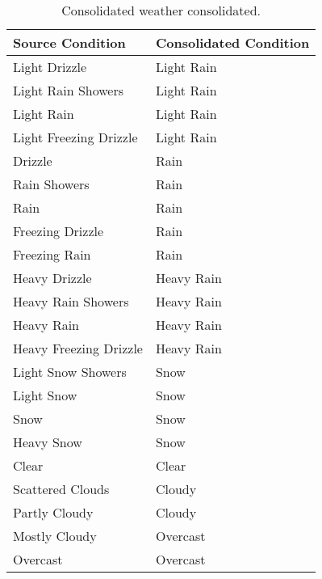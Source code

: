 \begin{table}[!ht]
\center
\begin{tabular}{ll}
	Source Condition & Consolidated Condition \\ \hline \hline 
	Light Drizzle & Light Rain \\
	Light Rain Showers & Light Rain \\
	Light Rain & Light Rain \\
	Light Freezing Drizzle & Light Rain \\ \hline
	Drizzle  & Rain \\
	Rain Showers & Rain \\
	Rain & Rain \\
	Freezing Drizzle & Rain \\
	Freezing Rain & Rain \\ \hline
	Heavy Drizzle & Heavy Rain \\
	Heavy Rain Showers & Heavy Rain \\
	Heavy Rain & Heavy Rain \\
	Heavy Freezing Drizzle & Heavy Rain \\ \hline
	Light Snow Showers & Snow \\
	Light Snow & Snow \\
	Snow & Snow \\ 
	Heavy Snow & Snow \\ \hline
	Clear & Clear \\ \hline
	Scattered Clouds & Cloudy \\
	Partly Cloudy & Cloudy \\ \hline
	Mostly Cloudy & Overcast \\ 
	Overcast & Overcast \\ \hline
\end{tabular}
\caption{Consolidated weather consolidated.}
\label{tab:consolidated_cond}
\end{table}